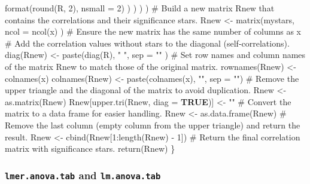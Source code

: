 \documentclass[
  bookmarksnumbered]{article}
\newenvironment{Shaded}{\begin{snugshade}}{\end{snugshade}}
\newcommand{\AttributeTok}[1]{\textcolor[rgb]{0.80,0.80,0.80}{#1}}
\newcommand{\CommentTok}[1]{\textcolor[rgb]{0.50,0.62,0.50}{#1}}
\newcommand{\ConstantTok}[1]{\textcolor[rgb]{0.86,0.64,0.64}{\textbf{#1}}}
\newcommand{\DecValTok}[1]{\textcolor[rgb]{0.86,0.86,0.80}{#1}}
\newcommand{\FunctionTok}[1]{\textcolor[rgb]{0.94,0.94,0.56}{#1}}
\newcommand{\NormalTok}[1]{\textcolor[rgb]{0.80,0.80,0.80}{#1}}
\newcommand{\OtherTok}[1]{\textcolor[rgb]{0.94,0.94,0.56}{#1}}
\newcommand{\SpecialCharTok}[1]{\textcolor[rgb]{0.86,0.64,0.64}{#1}}
\newcommand{\StringTok}[1]{\textcolor[rgb]{0.80,0.58,0.58}{#1}}
\begin{document}
\begin{Shaded}
\begin{Highlighting}[]
          \FunctionTok{format}\NormalTok{(}\FunctionTok{round}\NormalTok{(R, }\DecValTok{2}\NormalTok{), }\AttributeTok{nsmall =} \DecValTok{2}\NormalTok{)}
\NormalTok{        )}
\NormalTok{      )}
\NormalTok{    )}
\NormalTok{  )}
  \CommentTok{\# Build a new matrix \textquotesingle{}Rnew\textquotesingle{} that contains the correlations and their significance stars.}
\NormalTok{  Rnew }\OtherTok{\textless{}{-}} \FunctionTok{matrix}\NormalTok{(mystars,}
    \AttributeTok{ncol =} \FunctionTok{ncol}\NormalTok{(x)}
\NormalTok{  ) }\CommentTok{\# Ensure the new matrix has the same number of columns as \textquotesingle{}x\textquotesingle{}}
  \CommentTok{\# Add the correlation values without stars to the diagonal (self{-}correlations).}
  \FunctionTok{diag}\NormalTok{(Rnew) }\OtherTok{\textless{}{-}} \FunctionTok{paste}\NormalTok{(}\FunctionTok{diag}\NormalTok{(R), }\StringTok{" "}\NormalTok{,}
    \AttributeTok{sep =} \StringTok{""}
\NormalTok{  )}
  \CommentTok{\# Set row names and column names of the matrix \textquotesingle{}Rnew\textquotesingle{} to match those of the original matrix.}
  \FunctionTok{rownames}\NormalTok{(Rnew) }\OtherTok{\textless{}{-}} \FunctionTok{colnames}\NormalTok{(x)}
  \FunctionTok{colnames}\NormalTok{(Rnew) }\OtherTok{\textless{}{-}} \FunctionTok{paste}\NormalTok{(}\FunctionTok{colnames}\NormalTok{(x), }\StringTok{""}\NormalTok{, }\AttributeTok{sep =} \StringTok{""}\NormalTok{)}
  \CommentTok{\# Remove the upper triangle and the diagonal of the matrix to avoid duplication.}
\NormalTok{  Rnew }\OtherTok{\textless{}{-}} \FunctionTok{as.matrix}\NormalTok{(Rnew)}
\NormalTok{  Rnew[}\FunctionTok{upper.tri}\NormalTok{(Rnew, }\AttributeTok{diag =} \ConstantTok{TRUE}\NormalTok{)] }\OtherTok{\textless{}{-}} \StringTok{""}
  \CommentTok{\# Convert the matrix to a data frame for easier handling.}
\NormalTok{  Rnew }\OtherTok{\textless{}{-}} \FunctionTok{as.data.frame}\NormalTok{(Rnew)}
  \CommentTok{\# Remove the last column (empty column from the upper triangle) and return the result.}
\NormalTok{  Rnew }\OtherTok{\textless{}{-}} \FunctionTok{cbind}\NormalTok{(Rnew[}\DecValTok{1}\SpecialCharTok{:}\FunctionTok{length}\NormalTok{(Rnew) }\SpecialCharTok{{-}} \DecValTok{1}\NormalTok{])}
  \CommentTok{\# Return the final correlation matrix with significance stars.}
  \FunctionTok{return}\NormalTok{(Rnew)}
\NormalTok{\}}
\end{Highlighting}
\end{Shaded}

\subsubsection{\texorpdfstring{\texttt{lmer.anova.tab} and \texttt{lm.anova.tab}}{lmer.anova.tab and lm.anova.tab}}\label{lmer.anova.tab-and-lm.anova.tab}
\end{document}
